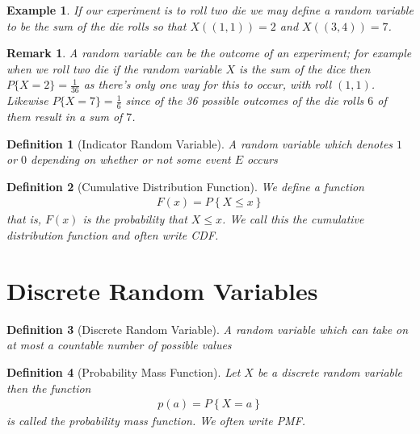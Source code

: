 \documentclass[11pt, oneside]{book}   	%
\newtheorem{definition}{Definition}[chapter]
\newtheorem{example}{Example}[chapter]
\newtheorem{remark}{Remark}[chapter]
\begin{document}
\begin{spacing}{1.618}
\begin{example}
	If our experiment is to roll two die we may define a random variable to be the sum of the die rolls so that $X( (1, 1) ) = 2$ and $X( (3, 4) )=7$. 
\end{example}

\begin{remark}
	A random variable can be the outcome of an experiment; for example when we roll two die if the random variable $X$ is the sum of the dice then $P\{X=2\}=\frac{1}{36}$ as there's only one way for this to occur, with roll $(1, 1)$. Likewise $P\{X=7\}=\frac{1}{6}$ since of the 36 possible outcomes of the die rolls $6$ of them result in a sum of $7$. 
\end{remark}

\begin{definition}[Indicator Random Variable]
	A random variable which denotes $1$ or $0$ depending on whether or not some event $E$ occurs 
\end{definition}

\begin{definition}[Cumulative Distribution Function]
	We define a function 
	\begin{alignat}{4}
		F(x)=P\left\{X\leq x\right\}
	\end{alignat}
	that is, $F(x)$ is the probability that $X\leq x$. We call this the cumulative distribution function and often write CDF.  
\end{definition}



\section{Discrete Random Variables}

\begin{definition}[Discrete Random Variable]
	A random variable which can take on at most a countable number of possible values
\end{definition}

\begin{definition}[Probability Mass Function]
	Let $X$ be a discrete random variable then the function 
	\begin{alignat}{4}
		p(a) = P\left\{X=a\right\}
	\end{alignat}
	is called the probability mass function. We often write PMF. 
\end{definition}


\end{spacing}
\end{document}
